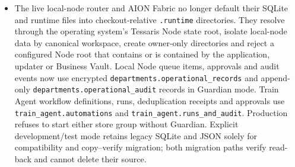 \documentclass[11pt]{article}
\newcommand{\code}[1]{\texttt{#1}}
\begin{document}
\begin{itemize}
  \item The live local-node router and AION Fabric no longer default their SQLite and runtime files into checkout-relative \code{.runtime} directories. They resolve through the operating system's Tessaris Node state root, isolate local-node data by canonical workspace, create owner-only directories and reject a configured Node root that contains or is contained by the application, updater or Business Vault. Local Node queue items, approvals and audit events now use encrypted \code{departments.operational\_records} and append-only \code{departments.operational\_audit} records in Guardian mode. Train Agent workflow definitions, runs, deduplication receipts and approvals use \code{train\_agent.automations} and \code{train\_agent.runs\_and\_audit}. Production refuses to start either store group without Guardian. Explicit development/test mode retains legacy SQLite and JSON solely for compatibility and copy--verify migration; both migration paths verify read-back and cannot delete their source.

\end{itemize}
\end{document}

